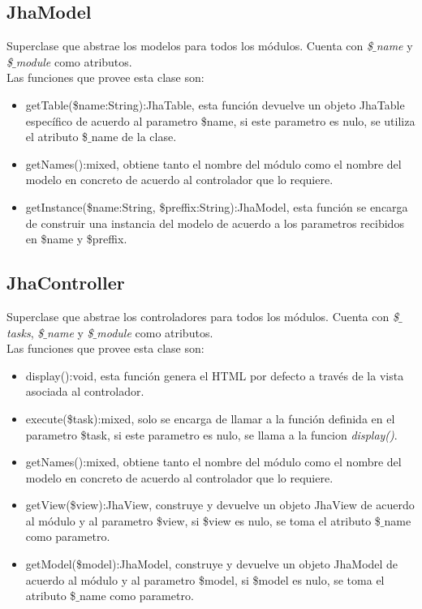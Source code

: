 \subsection{JhaModel}
Superclase que abstrae los modelos para todos los m\'odulos. Cuenta con \textit{\$$\_$name} y \textit{\$$\_$module} como atributos.\\
Las funciones que provee esta clase son:
\begin{itemize}
\item \textsf{getTable(\$name:String):JhaTable}, esta funci\'on devuelve un objeto JhaTable espec\'ifico de acuerdo al parametro \$name, si este parametro es nulo, se utiliza el atributo \$$\_$name de la clase.
\item \textsf{getNames():mixed}, obtiene tanto el nombre del m\'odulo como el nombre del modelo en concreto de acuerdo al controlador que lo requiere.
\item \textsf{getInstance(\$name:String, \$preffix:String):JhaModel}, esta funci\'on se encarga de construir una instancia del modelo de acuerdo a los parametros recibidos en \$name y \$preffix.
\end{itemize}

\subsection{JhaController}
Superclase que abstrae los controladores para todos los m\'odulos. Cuenta con \textit{\$$\_$tasks}, \textit{\$$\_$name} y \textit{\$$\_$module} como atributos.\\
Las funciones que provee esta clase son:
\begin{itemize}
\item \textsf{display():void}, esta funci\'on genera el HTML por defecto a trav\'es de la vista asociada al controlador.
\item \textsf{execute(\$task):mixed}, solo se encarga de llamar a la funci\'on definida en el parametro \$task, si este parametro es nulo, se llama a la funcion \textit{display()}.
\item \textsf{getNames():mixed}, obtiene tanto el nombre del m\'odulo como el nombre del modelo en concreto de acuerdo al controlador que lo requiere.
\item \textsf{getView(\$view):JhaView}, construye y devuelve un objeto JhaView de acuerdo al m\'odulo y al parametro \$view, si \$view es nulo, se toma el atributo \$$\_$name como parametro.
\item \textsf{getModel(\$model):JhaModel}, construye y devuelve un objeto JhaModel de acuerdo al m\'odulo y al parametro \$model, si \$model es nulo, se toma el atributo \$$\_$name como parametro.
\end{itemize}

